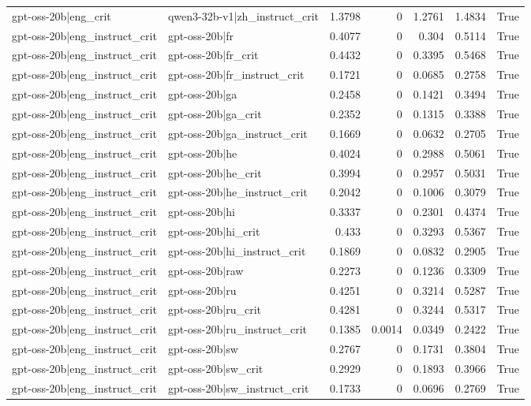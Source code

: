 \begin{table}
\begin{tabular}{l l r r r r l}
gpt-oss-20b|eng_crit & qwen3-32b-v1|zh_instruct_crit & 1.3798 & 0 & 1.2761 & 1.4834 & True \\
gpt-oss-20b|eng_instruct_crit & gpt-oss-20b|fr & 0.4077 & 0 & 0.304 & 0.5114 & True \\
gpt-oss-20b|eng_instruct_crit & gpt-oss-20b|fr_crit & 0.4432 & 0 & 0.3395 & 0.5468 & True \\
gpt-oss-20b|eng_instruct_crit & gpt-oss-20b|fr_instruct_crit & 0.1721 & 0 & 0.0685 & 0.2758 & True \\
gpt-oss-20b|eng_instruct_crit & gpt-oss-20b|ga & 0.2458 & 0 & 0.1421 & 0.3494 & True \\
gpt-oss-20b|eng_instruct_crit & gpt-oss-20b|ga_crit & 0.2352 & 0 & 0.1315 & 0.3388 & True \\
gpt-oss-20b|eng_instruct_crit & gpt-oss-20b|ga_instruct_crit & 0.1669 & 0 & 0.0632 & 0.2705 & True \\
gpt-oss-20b|eng_instruct_crit & gpt-oss-20b|he & 0.4024 & 0 & 0.2988 & 0.5061 & True \\
gpt-oss-20b|eng_instruct_crit & gpt-oss-20b|he_crit & 0.3994 & 0 & 0.2957 & 0.5031 & True \\
gpt-oss-20b|eng_instruct_crit & gpt-oss-20b|he_instruct_crit & 0.2042 & 0 & 0.1006 & 0.3079 & True \\
gpt-oss-20b|eng_instruct_crit & gpt-oss-20b|hi & 0.3337 & 0 & 0.2301 & 0.4374 & True \\
gpt-oss-20b|eng_instruct_crit & gpt-oss-20b|hi_crit & 0.433 & 0 & 0.3293 & 0.5367 & True \\
gpt-oss-20b|eng_instruct_crit & gpt-oss-20b|hi_instruct_crit & 0.1869 & 0 & 0.0832 & 0.2905 & True \\
gpt-oss-20b|eng_instruct_crit & gpt-oss-20b|raw & 0.2273 & 0 & 0.1236 & 0.3309 & True \\
gpt-oss-20b|eng_instruct_crit & gpt-oss-20b|ru & 0.4251 & 0 & 0.3214 & 0.5287 & True \\
gpt-oss-20b|eng_instruct_crit & gpt-oss-20b|ru_crit & 0.4281 & 0 & 0.3244 & 0.5317 & True \\
gpt-oss-20b|eng_instruct_crit & gpt-oss-20b|ru_instruct_crit & 0.1385 & 0.0014 & 0.0349 & 0.2422 & True \\
gpt-oss-20b|eng_instruct_crit & gpt-oss-20b|sw & 0.2767 & 0 & 0.1731 & 0.3804 & True \\
gpt-oss-20b|eng_instruct_crit & gpt-oss-20b|sw_crit & 0.2929 & 0 & 0.1893 & 0.3966 & True \\
gpt-oss-20b|eng_instruct_crit & gpt-oss-20b|sw_instruct_crit & 0.1733 & 0 & 0.0696 & 0.2769 & True \\

\end{tabular}
\end{table}
